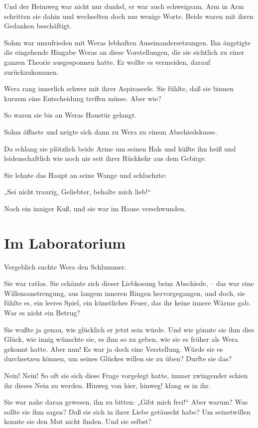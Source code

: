 Und der Heimweg war nicht nur dunkel, er war auch schweigsam. Arm
in Arm schritten sie dahin und wechselten doch nur wenige Worte.
Beide waren mit ihren Gedanken beschäftigt.

Sohm war unzufrieden mit Weras lebhaften Auseinandersetzungen. Ihn
ängstigte die eingehende Hingabe Weras an diese Vorstellungen, die
sie sichtlich zu einer ganzen Theorie ausgesponnen hatte. Er wollte
es vermeiden, darauf zurückzukommen.

Wera rang innerlich schwer mit ihrer Aspiraseele. Sie fühlte, daß
sie binnen kurzem eine Entscheidung treffen müsse. Aber wie?

So waren sie bis an Weras Haustür gelangt.

Sohm öffnete und neigte sich dann zu Wera zu einem Abschiedskusse.

Da schlang sie plötzlich beide Arme um seinen Hals und küßte ihn
heiß und leidenschaftlich wie noch nie seit ihrer Rückkehr aus dem
Gebirge.

Sie lehnte das Haupt an seine Wange und schluchzte:

„Sei nicht traurig, Geliebter, behalte mich lieb!“

Noch ein inniger Kuß, und sie war im Hause verschwunden.

\section{Im Laboratorium}

Vergeblich suchte Wera den Schlummer.

Sie war ratlos. Sie schämte sich dieser Liebkosung beim Abschiede,
– das war eine Willensanstrengung, aus langem inneren Ringen
hervorgegangen, und doch, sie fühlte es, ein leeres Spiel, ein
künstliches Feuer, das ihr keine innere Wärme gab. War es nicht ein
Betrug?

Sie wußte ja genau, wie glücklich er jetzt sein würde. Und wie
gönnte sie ihm dies Glück, wie innig wünschte sie, es ihm so zu
geben, wie sie es früher als Wera gekonnt hatte. Aber nun! Es war
ja doch eine Verstellung. Würde sie es durchsetzen können, um
seines Glückes willen sie zu üben? Durfte sie das?

Nein! Nein! So oft sie sich diese Frage vorgelegt hatte, immer
zwingender schien ihr dieses Nein zu werden. Hinweg von hier,
hinweg! klang es in ihr.

Sie war nahe daran gewesen, ihn zu bitten: „Gibt mich frei!“ Aber
warum? Was sollte sie ihm sagen? Daß sie sich in ihrer Liebe
getäuscht habe? Um seinetwillen konnte sie den Mut nicht finden.
Und sie selbst?


